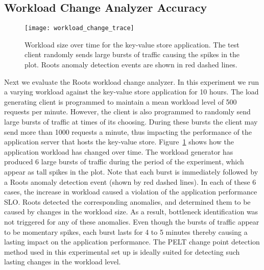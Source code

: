 \subsection{Workload Change Analyzer Accuracy}
\begin{figure}
\centering
\texttt{[image: workload\_change\_trace]}
\caption{Workload size over time for the key-value store application. The test client randomly sends
large bursts of traffic causing the spikes in the plot. Roots anomaly detection events are shown
in red dashed lines.}
\label{fig:workload_change}
\end{figure}

Next we evaluate the Roots workload change analyzer. In this experiment we run a varying workload
against the key-value store application for 10 hours. The load generating client is programmed
to maintain a mean workload level of 500 requests per minute. However, the client
is also programmed to randomly send large bursts of traffic at times of its choosing. During these bursts 
the client may send more than 1000 requests a minute, thus impacting the performance of
the application server that hosts the key-value store. Figure~\ref{fig:workload_change} shows how
the application workload has changed over time. The workload generator has produced 6 large bursts of traffic during the 
period of the experiment, which appear as tall spikes in the plot.
Note that each burst is immediately followed by a Roots anomaly detection event (shown by red dashed lines). 
In each of these 6 cases, the increase in workload caused a violation of the application performance SLO.
Roots detected the corresponding anomalies, and determined them to be caused by changes in the workload size.
As a result, bottleneck identification was not triggered for any of these anomalies.
Even though the bursts of traffic appear to be momentary
spikes, each burst lasts for 4 to 5 minutes thereby causing a lasting impact on the application performance.
The PELT change point detection method used in this experimental set up is ideally suited for detecting
such lasting changes in the workload level.

